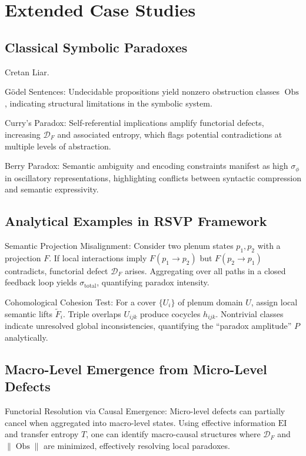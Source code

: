 \documentclass[12pt]{article}
\theoremstyle{plain}
\begin{document}
\section{Extended Case Studies}

\subsection{Classical Symbolic Paradoxes}

Cretan Liar.

Gödel Sentences: Undecidable propositions yield nonzero obstruction classes \(\operatorname{Obs}\), indicating structural limitations in the symbolic system.

Curry’s Paradox: Self-referential implications amplify functorial defects, increasing \(\mathcal{D}_F\) and associated entropy, which flags potential contradictions at multiple levels of abstraction.

Berry Paradox: Semantic ambiguity and encoding constraints manifest as high \(\sigma_\phi\) in oscillatory representations, highlighting conflicts between syntactic compression and semantic expressivity.

\subsection{Analytical Examples in RSVP Framework}

Semantic Projection Misalignment: Consider two plenum states \(p_1, p_2\) with a projection \(F\). If local interactions imply \(F(p_1 \to p_2)\) but \(F(p_2 \to p_1)\) contradicts, functorial defect \(\mathcal{D}_F\) arises. Aggregating over all paths in a closed feedback loop yields \(\sigma_{\mathrm{total}}\), quantifying paradox intensity.

Cohomological Cohesion Test: For a cover \(\{U_i\}\) of plenum domain \(U\), assign local semantic lifts \(\widetilde{F}_i\). Triple overlaps \(U_{ijk}\) produce cocycles \(h_{ijk}\). Nontrivial classes indicate unresolved global inconsistencies, quantifying the “paradox amplitude” \(P\) analytically.

\subsection{Macro-Level Emergence from Micro-Level Defects}

Functorial Resolution via Causal Emergence: Micro-level defects can partially cancel when aggregated into macro-level states. Using effective information \(\text{EI}\) and transfer entropy \(T\), one can identify macro-causal structures where \(\mathcal{D}_F\) and \(\|\operatorname{Obs}\|\) are minimized, effectively resolving local paradoxes.
\end{document}
